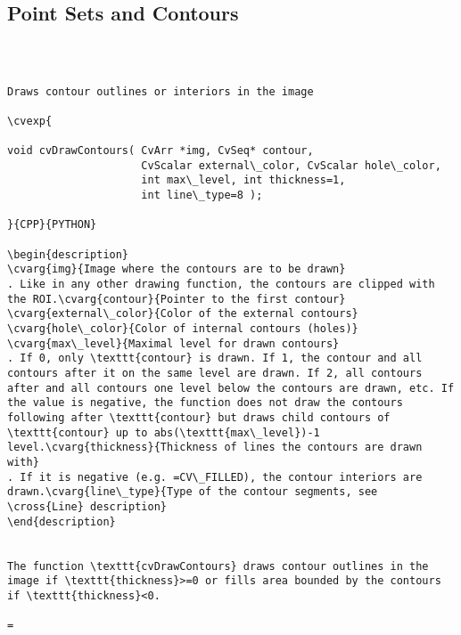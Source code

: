\subsection{Point Sets and Contours}
\begin{verbatim}


\end{verbatim}
\begin{verbatim}

Draws contour outlines or interiors in the image

\cvexp{

void cvDrawContours( CvArr *img, CvSeq* contour,
                     CvScalar external\_color, CvScalar hole\_color,
                     int max\_level, int thickness=1,
                     int line\_type=8 );

}{CPP}{PYTHON}

\begin{description}
\cvarg{img}{Image where the contours are to be drawn}
. Like in any other drawing function, the contours are clipped with the ROI.\cvarg{contour}{Pointer to the first contour}
\cvarg{external\_color}{Color of the external contours}
\cvarg{hole\_color}{Color of internal contours (holes)}
\cvarg{max\_level}{Maximal level for drawn contours}
. If 0, only \texttt{contour} is drawn. If 1, the contour and all contours after it on the same level are drawn. If 2, all contours after and all contours one level below the contours are drawn, etc. If the value is negative, the function does not draw the contours following after \texttt{contour} but draws child contours of \texttt{contour} up to abs(\texttt{max\_level})-1 level.\cvarg{thickness}{Thickness of lines the contours are drawn with}
. If it is negative (e.g. =CV\_FILLED), the contour interiors are drawn.\cvarg{line\_type}{Type of the contour segments, see \cross{Line} description}
\end{description}


The function \texttt{cvDrawContours} draws contour outlines in the image if \texttt{thickness}>=0 or fills area bounded by the contours if \texttt{thickness}<0.

=\end{verbatim}
